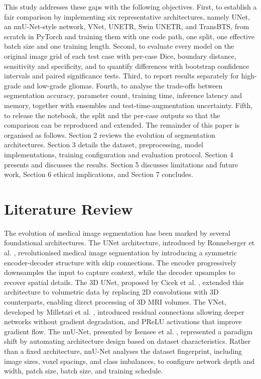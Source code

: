 \documentclass[final,3p,times,number]{elsarticle}
\begin{document}
This study addresses these gaps with the following objectives. First, to establish a fair comparison by implementing six representative architectures, namely UNet, an nnU-Net-style network, VNet, UNETR, Swin UNETR, and TransBTS, from scratch in PyTorch and training them with one code path, one split, one effective batch size and one training length. Second, to evaluate every model on the original image grid of each test case with per-case Dice, boundary distance, sensitivity and specificity, and to quantify differences with bootstrap confidence intervals and paired significance tests. Third, to report results separately for high-grade and low-grade gliomas. Fourth, to analyse the trade-offs between segmentation accuracy, parameter count, training time, inference latency and memory, together with ensembles and test-time-augmentation uncertainty. Fifth, to release the notebook, the split and the per-case outputs so that the comparison can be reproduced and extended. The remainder of this paper is organised as follows. Section 2 reviews the evolution of segmentation architectures. Section 3 details the dataset, preprocessing, model implementations, training configuration and evaluation protocol. Section 4 presents and discusses the results. Section 5 discusses limitations and future work, Section 6 ethical implications, and Section 7 concludes.

\section{Literature Review}

The evolution of medical image segmentation has been marked by several foundational architectures. The UNet architecture, introduced by Ronneberger et al. \cite{ref1}, revolutionised medical image segmentation by introducing a symmetric encoder-decoder structure with skip connections. The encoder progressively downsamples the input to capture context, while the decoder upsamples to recover spatial details. The 3D UNet, proposed by Cicek et al. \cite{ref3}, extended this architecture to volumetric data by replacing 2D convolutions with 3D counterparts, enabling direct processing of 3D MRI volumes. The VNet, developed by Milletari et al. \cite{ref4}, introduced residual connections allowing deeper networks without gradient degradation, and PReLU activations that improve gradient flow. The nnU-Net, presented by Isensee et al. \cite{ref7}, represented a paradigm shift by automating architecture design based on dataset characteristics. Rather than a fixed architecture, nnU-Net analyses the dataset fingerprint, including image sizes, voxel spacings, and class imbalances, to configure network depth and width, patch size, batch size, and training schedule.
\end{document}
